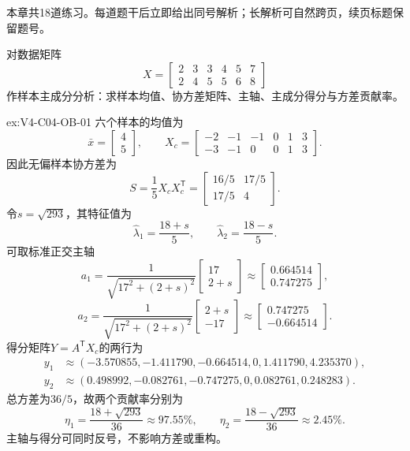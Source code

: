 \label{struct:V4-C04-CH34}
\begin{chapterexercisebox}
\label{struct:V4-C04-CH35}
本章共18道练习。每道题干后立即给出同号解析；长解析可自然跨页，续页标题保留题号。
\end{chapterexercisebox}

\begin{SLChapterExercisePairSection}

\begin{exercise}\label{ex:V4-C04-OB-01}
对数据矩阵
\[
X=\begin{bmatrix}
2&3&3&4&5&7\\
2&4&5&5&6&8
\end{bmatrix}
\]
作样本主成分分析：求样本均值、协方差矩阵、主轴、主成分得分与方差贡献率。
\end{exercise}
\ifSLFullEdition
{}\label{sol:V4-C04-OB-01}
\begin{chapterexercisesolution}{ex:V4-C04-OB-01}
六个样本的均值为
\[
\bar x=\begin{bmatrix}4\\5\end{bmatrix},
\qquad
X_c=\begin{bmatrix}
-2&-1&-1&0&1&3\\
-3&-1&0&0&1&3
\end{bmatrix}.
\]
因此无偏样本协方差为
\[
S=\frac15X_cX_c^{\mathsf T}
=\begin{bmatrix}16/5&17/5\\17/5&4\end{bmatrix}.
\]
令$s=\sqrt{293}$，其特征值为
\[
\widehat\lambda_1=\frac{18+s}{5},\qquad
\widehat\lambda_2=\frac{18-s}{5}.
\]
可取标准正交主轴
\[
a_1=\frac1{\sqrt{17^2+(2+s)^2}}
\begin{bmatrix}17\\2+s\end{bmatrix}
\approx\begin{bmatrix}0.664514\\0.747275\end{bmatrix},
\]
\[
a_2=\frac1{\sqrt{17^2+(2+s)^2}}
\begin{bmatrix}2+s\\-17\end{bmatrix}
\approx\begin{bmatrix}0.747275\\-0.664514\end{bmatrix}.
\]
得分矩阵$Y=A^{\mathsf T}X_c$的两行为
\[
\begin{aligned}
y_1&\approx(-3.570855,-1.411790,-0.664514,0,1.411790,4.235370),\\
y_2&\approx(0.498992,-0.082761,-0.747275,0,0.082761,0.248283).
\end{aligned}
\]
总方差为$36/5$，故两个贡献率分别为
\[
\eta_1=\frac{18+\sqrt{293}}{36}\approx97.55\%,
\qquad
\eta_2=\frac{18-\sqrt{293}}{36}\approx2.45\%.
\]
主轴与得分可同时反号，不影响方差或重构。
\end{chapterexercisesolution}
\fi


\end{SLChapterExercisePairSection}
